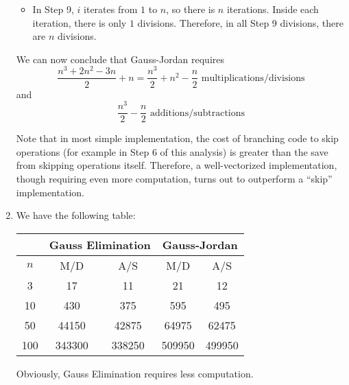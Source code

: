 \documentclass[../../../../Assignments]{subfiles}
\begin{document}
\begin{solution}
\begin{enumerate}[label = \alph*)]
\begin{itemize}
                \item In Step 9, \(i\) iterates from \(1\) to \(n\), so there is
                    \(n\) iterations. Inside each iteration, there is only \(1\)
                    divisions. Therefore, in all Step 9 divisions, there are
                    \(n\) divisions.
            \end{itemize}

            We can now conclude that Gauss-Jordan requires
            \[\frac{n^3 + 2n^2 - 3n}{2} + n = \frac{n^3}{2} + n^2 - \frac{n}{2} \text{ multiplications/divisions}\]
            and
            \[\frac{n^3}{2} - \frac{n}{2} \text{ additions/subtractions}\]

            Note that in most simple implementation, the cost of branching code
            to skip operations (for example in Step 6 of this analysis) is
            greater than the save from skipping operations itself. Therefore, a
            well-vectorized implementation, though requiring even more
            computation, turns out to outperform a ``skip'' implementation.

        \item We have the following table:
            \begin{table}[H]
                \centering
                \begin{tabular}{ccccc}
                    \toprule
                    &  \multicolumn{2}{c}{Gauss Elimination}  &  \multicolumn{2}{c}{Gauss-Jordan}  \\
                    \midrule
                    \(n\)  &  M/D  &  A/S  &  M/D  &  A/S  \\
                    \midrule
                    3    &  17      &  11      &  21      &  12      \\
                    10   &  430     &  375     &  595     &  495     \\
                    50   &  44150   &  42875   &  64975   &  62475   \\
                    100  &  343300  &  338250  &  509950  &  499950  \\
                    \bottomrule
                \end{tabular}
            \end{table}

            Obviously, Gauss Elimination requires less computation.
    \end{enumerate}
\end{solution}
\end{document}
